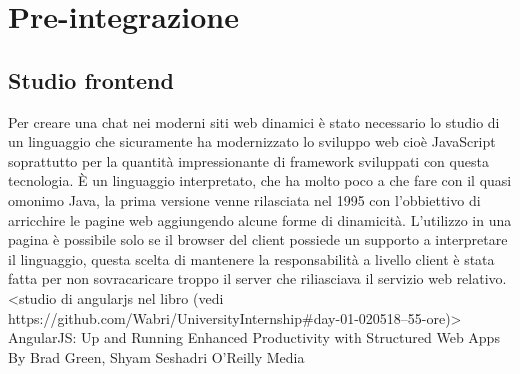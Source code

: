 \chapter{Pre-integrazione}


\section{Studio frontend}
Per creare una chat nei moderni siti web dinamici è stato necessario lo studio di un linguaggio che sicuramente ha modernizzato lo sviluppo web cioè JavaScript soprattutto per la quantità impressionante di framework sviluppati con questa tecnologia.
È un linguaggio interpretato, che ha molto poco a che fare con il quasi omonimo Java, la prima versione venne rilasciata nel 1995 con l'obbiettivo di arricchire le pagine web aggiungendo alcune forme di dinamicità. L'utilizzo in una pagina è possibile solo se il browser del client possiede un supporto a interpretare il linguaggio, questa scelta di mantenere la responsabilità a livello client è stata fatta per non sovracaricare troppo il server che riliasciava il servizio web relativo.
\iffalse
<studio di angularjs nel libro (vedi https://github.com/Wabri/UniversityInternship#day-01-020518--55-ore)>
AngularJS: Up and Running
Enhanced Productivity with Structured Web Apps
By Brad Green, Shyam Seshadri 
O'Reilly Media

